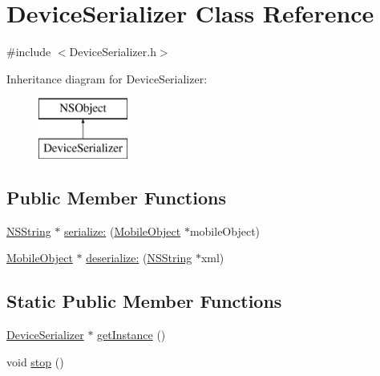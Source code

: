 \hypertarget{interface_device_serializer}{
\section{\-Device\-Serializer \-Class \-Reference}
\label{interface_device_serializer}
}


{\ttfamily \#include $<$\-Device\-Serializer.\-h$>$}

\-Inheritance diagram for \-Device\-Serializer\-:\begin{figure}[H]
\begin{center}
\leavevmode
\includegraphics[height=2.000000cm]{interface_device_serializer}
\end{center}
\end{figure}
\subsection*{\-Public \-Member \-Functions}
\begin{DoxyCompactItemize}
\item 
\hyperlink{class_n_s_string}{\-N\-S\-String} $\ast$ \hyperlink{interface_device_serializer_a4c2befa4c03252893a258a355b0779ba}{serialize\-:} (\hyperlink{interface_mobile_object}{\-Mobile\-Object} $\ast$mobile\-Object)
\item 
\hyperlink{interface_mobile_object}{\-Mobile\-Object} $\ast$ \hyperlink{interface_device_serializer_a20c5d36f5b798f86062ae428626e07ab}{deserialize\-:} (\hyperlink{class_n_s_string}{\-N\-S\-String} $\ast$xml)
\end{DoxyCompactItemize}
\subsection*{\-Static \-Public \-Member \-Functions}
\begin{DoxyCompactItemize}
\item 
\hyperlink{interface_device_serializer}{\-Device\-Serializer} $\ast$ \hyperlink{interface_device_serializer_ae6fdc6a660af32bdddb3b34a74666ea4}{get\-Instance} ()
\item 
void \hyperlink{interface_device_serializer_a696da8c2380932347ca6129db8cb9e25}{stop} ()
\end{DoxyCompactItemize}


